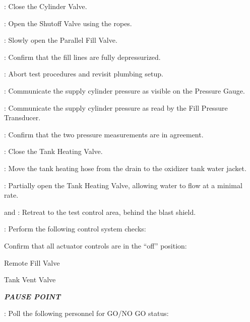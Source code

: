 \begin{checklist}
\begin{checklist}[label=$\bullet$]
\begin{checklist}
            \item \primary{}: Close the Cylinder Valve.
            \item \primary{}: Open the Shutoff Valve using the ropes.
            \item \primary{}: Slowly open the Parallel Fill Valve.
            \item \daq{}: Confirm that the fill lines are fully depressurized.
            \item \ops{}: Abort test procedures and revisit plumbing setup.
        \end{checklist}
    \end{checklist}
    \item \primary{}: Communicate the supply cylinder pressure as visible on the Pressure Gauge.
    \item \daq{}: Communicate the supply cylinder pressure as read by the Fill Pressure Transducer.
    \item \daq{}: Confirm that the two pressure measurements are in agreement.
    \item \heat: Close the Tank Heating Valve.
    \item \primary: Move the tank heating hose from the drain to the oxidizer tank water jacket.
    \item \heat: Partially open the Tank Heating Valve, allowing water to flow at a minimal rate.
    \item \primary{} and \secondary: Retreat to the test control area, behind the blast shield.
    \item \primary{}: Perform the following control system checks:
    \begin{checklist}
        \item Confirm that all actuator controls are in the ``off'' position:
        \begin{checklist}
            \item Remote Fill Valve
            \item Tank Vent Valve
        \end{checklist}
    \end{checklist}
    \item \textbf{\textit{PAUSE POINT}}
    \item \ops{}: Poll the following personnel for GO/NO GO status:
    \begin{checklist}
        \item \peri{}
        \item \perii{}
        \item \heat

\end{checklist}
\end{checklist}
